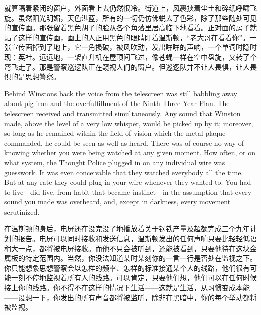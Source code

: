 \begin{paracol}{2}
\switchcolumn

就算隔着紧闭的窗户，外面看上去仍然很冷。街道上，风裹挟着尘土和碎纸呼啸飞旋。虽然阳光明媚，天色湛蓝，所有的一切仍仿佛蜕去了色彩，除了那些随处可见的宣传画。那张留着黑色胡子的脸从各个角落里居高临下地看着。正对面的房子就贴了这样的宣传画，画上的人正用黑色的眼睛盯着温斯顿，``老大哥在看着你''。一张宣传画掉到了地上，它一角损破，被风吹动，发出啪啪的声响，一个单词时隐时现：英社。远远地，一架直升机在屋顶间飞过，像苍蝇一样在空中盘旋，又转了个弯飞走了。那是警察巡逻队正在窥视人们的窗户。但巡逻队并不让人畏惧，让人畏惧的是思想警察。

\switchcolumn*

Behind Winston\textquotesingle s back the voice from the telescreen was
still babbling away about pig iron and the overfulfillment of the Ninth
Three-Year Plan. The telescreen received and transmitted simultaneously.
Any sound that Winston made, above the level of a very low whisper,
would be picked up by it; moreover, so long as he remained within the
field of vision which the metal plaque commanded, he could be seen as
well as heard. There was of course no way of knowing whether you were
being watched at any given moment. How often, or on what system, the
Thought Police plugged in on any individual wire was guesswork. It was
even conceivable that they watched everybody all the time. But at any
rate they could plug in your wire whenever they wanted to. You had to
live---did live, from habit that became instinct---in the assumption
that every sound you made was overheard, and, except in darkness, every
movement scrutinized.

\switchcolumn

在温斯顿的身后，电屏还在没完没了地播放着关于钢铁产量及超额完成三个九年计划的报告。电屏可以同时接收和发送信息，温斯顿发出的任何声响只要比轻轻低语稍大一点，都将被电屏接收。而他不只会被听到，还能被看到，只要他待在这块金属板的特定范围内。当然，你没法知道某时某刻你的一言一行是否处在监视之下。你只能想象思想警察会以怎样的频率、怎样的标准接通某个人的线路，他们很有可能一刻不停地监视着所有人的线路。可以肯定，只要他们想，他们可以在任何时候接上你的线路。你不得不在这样的情况下生活——这就是生活，从习惯变成本能——设想一下，你发出的所有声音都将被监听，除非在黑暗中，你的每个举动都将被监视。

\switchcolumn*


\end{paracol}
